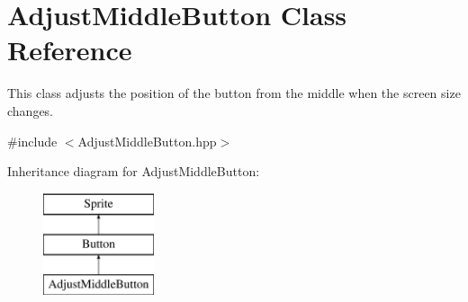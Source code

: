 \hypertarget{class_adjust_middle_button}{\section{Adjust\-Middle\-Button Class Reference}
\label{class_adjust_middle_button}
}


This class adjusts the position of the button from the middle when the screen size changes.  




{\ttfamily \#include $<$Adjust\-Middle\-Button.\-hpp$>$}

Inheritance diagram for Adjust\-Middle\-Button\-:\begin{figure}[H]
\begin{center}
\leavevmode
\includegraphics[height=3.000000cm]{class_adjust_middle_button}
\end{center}
\end{figure}
